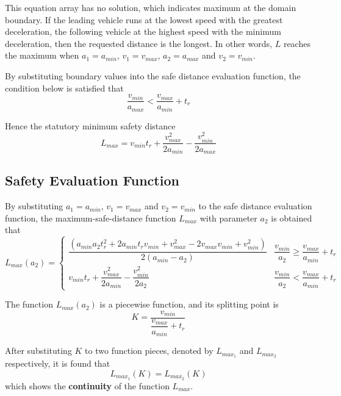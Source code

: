 This equation array has no solution, which indicates maximum 
at the domain boundary. If the leading vehicle runs at the 
lowest speed with the greatest deceleration, the following 
vehicle at the highest speed with the minimum deceleration, 
then the requested distance is the longest. In other words, 
$ L $ reaches the maximum when $ a_1 = a_{min} $, $ v_1 = 
v_{max} $, $ a_2 = a_{max} $ and $ v_2 = v_{min} $.

By substituting boundary values into the safe distance 
evaluation function, the condition below is satisfied that 
\begin{displaymath}
\dfrac{v_{min}}{a_{max}}  < \dfrac{v_{max}}{a_{min}} + t_r
\end{displaymath}

Hence the statutory minimum safety distance 
\begin{displaymath}
L_{max} = v_{min} t_r + \dfrac{v_{max} ^ 2}{2a_{min}} - 
\dfrac{v_{min}^2}{2a_{max}}
\end{displaymath}


\subsection{Safety Evaluation Function}

By substituting $ a_1 = a_{min} $, $ v_1 = v_{max} $ and 
$ v_2 = v_{min} $ to the safe distance evaluation function, 
the maximum-safe-distance function $ L_{max} $ with 
parameter $ a_2 $ is obtained that
\begin{displaymath}
L_{max}(a_2) = 
\left \{
\begin{array}{cl}
\dfrac{(a_{min}a_2t_r^2 + 2a_{min}t_rv_{min} + v_{max}^2 - 
2v_{max}v_{min} + v_{min}^2)}{2(a_{min}-a_2)} & 
\dfrac{v_{min}}{a_2}  \geq \dfrac{v_{max}}{a_{min}} + t_r \\
v_{min} t_r + \dfrac{v_{max} ^ 2}{2a_{min}} - \dfrac{
v_{min}^2}{2a_2} & \dfrac{v_{min}}{a_2}  < \dfrac{v_{max}}
{a_{min}} + t_r
\end{array}
\right .
\end{displaymath}

The function $ L_{max}(a_2) $ is a piecewise function, and 
its splitting point is 
\begin{displaymath}
K = \dfrac{v_{min}}{\dfrac{v_{max}}{a_{min}} + t_r}
\end{displaymath}

After substituting $ K $ to two function pieces, denoted by 
$ L_{max_1} $ and $ L_{max_2} $ respectively, it is found 
that 
\begin{equation}\label{eq: Function L - Continuity}
L_{max_1}(K) = L_{max_2}(K)
\end{equation}
which shows the \textbf{continuity} of the function 
$ L_{max} $.


